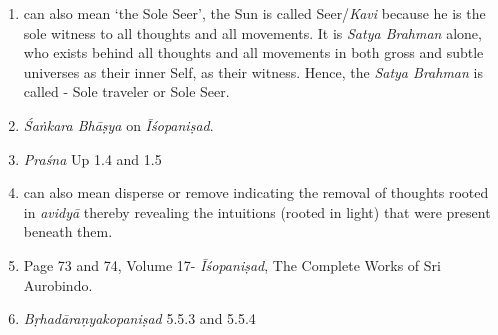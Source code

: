 \begin{enumerate}
\item
   can also mean `the Sole Seer', the Sun is called Seer/\emph{Kavi} because he is the sole witness to all thoughts and all movements. It is \emph{Satya Brahman} alone, who exists behind all thoughts and all movements in both gross and subtle universes as their inner Self, as their witness. Hence, the \emph{Satya Brahman} is called - Sole traveler or Sole Seer.
\item
  \emph{Śaṅkara Bhāṣya} on \emph{Īśopaniṣad}.
\item
  \emph{Praśna} Up 1.4 and 1.5
\item
   can also mean disperse or remove indicating the removal of thoughts rooted in \emph{avidyā} thereby revealing the intuitions (rooted in light) that were present beneath them.
\item
  Page 73 and 74, Volume 17- \emph{Īśopaniṣad}, The Complete Works of Sri Aurobindo.
\item
  \emph{Bṛhadāraṇyakopaniṣad} 5.5.3 and 5.5.4
\end{enumerate}


